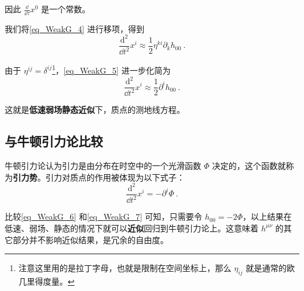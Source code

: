 因此 $\frac{\dd}{\dd\tau}x^0$ 是一个常数。

我们将\autoref{eq_WeakG_4} 进行移项，得到
\begin{equation}\label{eq_WeakG_5}
\frac{\mathrm{d}^2}{\dd t^2}x^i\approx\frac{1}{2}\eta^{ki}\partial_kh_{00}~.
\end{equation}

由于 $\eta^{ij}=\delta^{ij}$\footnote{注意这里用的是拉丁字母，也就是限制在空间坐标上，那么 $\eta_{ij}$ 就是通常的欧几里得度量。}，\autoref{eq_WeakG_5} 进一步化简为
\begin{equation}\label{eq_WeakG_6}
\frac{\mathrm{d}^2}{\dd t^2}x^i\approx\frac{1}{2}\partial^ih_{00}~.
\end{equation}

这就是\textbf{低速弱场静态近似}下，质点的测地线方程。

\subsection{与牛顿引力论比较}

牛顿引力论认为引力是由分布在时空中的一个光滑函数 $\Phi$ 决定的，这个函数就称为\textbf{引力势}。引力对质点的作用被体现为以下式子：
\begin{equation}\label{eq_WeakG_7}
\frac{\mathrm{d}^2}{\dd t^2}x^i=-\partial^i\Phi~.
\end{equation}

比较\autoref{eq_WeakG_6} 和\autoref{eq_WeakG_7} 可知，只需要令 $h_{00}=-2\Phi$，以上结果在低速、弱场、静态的情况下就可以\textbf{近似}回归到牛顿引力论上。这意味着 $h^{\mu\nu}$ 的其它部分并不影响近似结果，是冗余的自由度。









